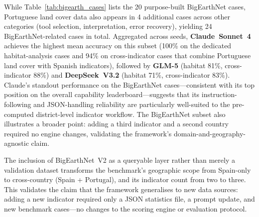 \documentclass[10pt,twocolumn]{article}
\begin{document}
\begin{table}[t]
\caption{BigEarthNet V2 benchmark cases by task pattern. All cases use Portuguese districts with pre-computed ground truth.}
\label{tab:bigearth_cases}
\centering
{}
\end{table}

While Table~\ref{tab:bigearth_cases} lists the 20 purpose-built BigEarthNet cases, Portuguese land cover data also appears in 4 additional cases across other categories (tool selection, interpretation, error recovery), yielding 24 BigEarthNet-related cases in total. Aggregated across seeds, \textbf{Claude~Sonnet~4} achieves the highest mean accuracy on this subset (100\% on the dedicated habitat-analysis cases and 94\% on cross-indicator cases that combine Portuguese land cover with Spanish indicators), followed by \textbf{GLM-5} (habitat 81\%, cross-indicator 88\%) and \textbf{DeepSeek~V3.2} (habitat 71\%, cross-indicator 83\%). Claude's standout performance on the BigEarthNet cases---consistent with its top position on the overall capability leaderboard---suggests that its instruction-following and JSON-handling reliability are particularly well-suited to the pre-computed district-level indicator workflow. The BigEarthNet subset also illustrates a broader point: adding a third indicator and a second country required no engine changes, validating the framework's domain-and-geography-agnostic claim.

The inclusion of BigEarthNet~V2 as a queryable layer rather than merely a validation dataset transforms the benchmark's geographic scope from Spain-only to cross-country (Spain + Portugal), and its indicator count from two to three. This validates the claim that the framework generalises to new data sources: adding a new indicator required only a JSON statistics file, a prompt update, and new benchmark cases---no changes to the scoring engine or evaluation protocol.
\end{document}
